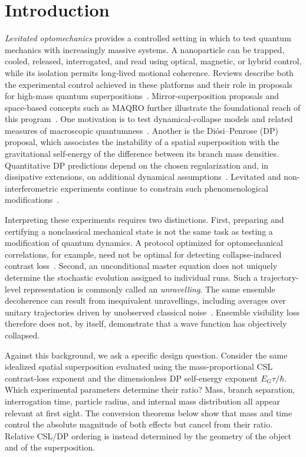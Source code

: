 \documentclass[
  aps,
  prd,
  preprint,
  notitlepage,
  superscriptaddress,
  nofootinbib,
  longbibliography
]{revtex4-2}
\begin{document}
\section{Introduction}
\label{sec:introduction}
\emph{Levitated optomechanics} provides a controlled setting in which to test quantum mechanics with increasingly massive systems. A nanoparticle can be trapped, cooled, released, interrogated, and read using optical, magnetic, or hybrid control, while its isolation permits long-lived motional coherence. Reviews describe both the experimental control achieved in these platforms and their role in proposals for high-mass quantum superpositions~\cite{Aspelmeyer2014,Millen2020}. Mirror-superposition proposals and space-based concepts such as MAQRO further illustrate the foundational reach of this program~\cite{Marshall2003,Kaltenbaek2012,Kaltenbaek2015}. One motivation is to test dynamical-collapse models and related measures of macroscopic quantumness~\cite{Pearle1989,GhirardiPearleRimini1990,BassiGhirardi2003,Bassi2013,Nimmrichter2013,RomeroIsart2011}. Another is the Di\'osi--Penrose (DP) proposal, which associates the instability of a spatial superposition with the gravitational self-energy of the difference between its branch mass densities. Quantitative DP predictions depend on the chosen regularization and, in dissipative extensions, on additional dynamical assumptions~\cite{Diosi1987,Diosi1989,Penrose1996,Bahrami2014,Diosi2022}. Levitated and non-interferometric experiments continue to constrain such phenomenological modifications~\cite{Carlesso2022,DiBartolomeoCarlesso2024}.

Interpreting these experiments requires two distinctions. First, preparing and certifying a nonclassical mechanical state is not the same task as testing a modification of quantum dynamics. A protocol optimized for optomechanical correlations, for example, need not be optimal for detecting collapse-induced contrast loss~\cite{Pitchford2020}. Second, an unconditional master equation does not uniquely determine the stochastic evolution assigned to individual runs. Such a trajectory-level representation is commonly called an \emph{unravelling}. The same ensemble decoherence can result from inequivalent unravellings, including averages over unitary trajectories driven by unobserved classical noise~\cite{WisemanMilburn2010}. Ensemble visibility loss therefore does not, by itself, demonstrate that a wave function has objectively collapsed.

Against this background, we ask a specific design question. Consider the same idealized spatial superposition evaluated using the mass-proportional CSL contrast-loss exponent and the dimensionless DP self-energy exponent $E_G\tau/\hbar$. Which experimental parameters determine their ratio? Mass, branch separation, interrogation time, particle radius, and internal mass distribution all appear relevant at first sight. The conversion theorems below show that mass and time control the absolute magnitude of both effects but cancel from their ratio. Relative CSL/DP ordering is instead determined by the geometry of the object and of the superposition.
\end{document}
